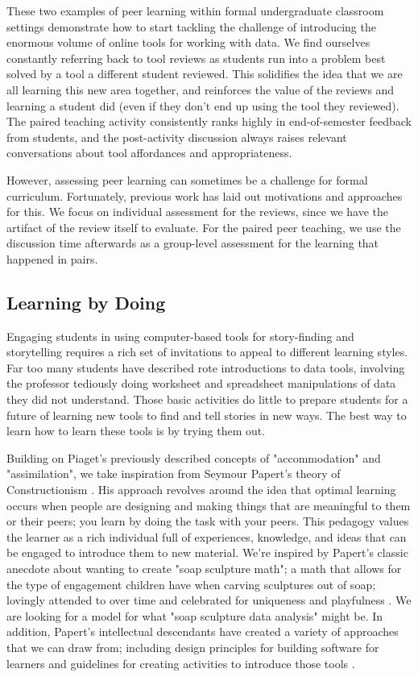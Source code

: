 \documentclass{acm_proc_article-sp}
\begin{document}
These two examples of peer learning within formal undergraduate classroom settings demonstrate how to start tackling the challenge of introducing the enormous volume of online tools for working with data.  We find ourselves constantly referring back to tool reviews as students run into a problem best solved by a tool a different student reviewed.  This solidifies the idea that we are all learning this new area together, and reinforces the value of the reviews and learning a student did (even if they don't end up using the tool they reviewed).  The paired teaching activity consistently ranks highly in end-of-semester feedback from students, and the post-activity discussion always raises relevant conversations about tool affordances and appropriateness.

However, assessing peer learning can sometimes be a challenge for formal curriculum.  Fortunately, previous work has laid out motivations and approaches for this\cite{boud_peer_1999}.  We focus on individual assessment for the reviews, since we have the artifact of the review itself to evaluate.  For the paired peer teaching, we use the discussion time afterwards as a group-level assessment for the learning that happened in pairs.

\subsection{Learning by Doing}

Engaging students in using computer-based tools for story-finding and storytelling requires a rich set of invitations to appeal to different learning styles.  Far too many students have described rote introductions to data tools, involving the professor tediously doing worksheet and spreadsheet manipulations of data they did not understand. Those basic activities do little to prepare students for a future of learning new tools to find and tell stories in new ways. The best way to learn how to learn these tools is by trying them out.

Building on Piaget's previously described concepts of "accommodation" and "assimilation", we take inspiration from Seymour Papert's theory of Constructionism \cite{papert_childrens_1994}.  His approach revolves around the idea that optimal learning occurs when people are designing and making things that are meaningful to them or their peers; you learn by doing the task with your peers.  This pedagogy values the learner as a rich individual full of experiences, knowledge, and ideas that can be engaged to introduce them to new material.  We're inspired by Papert's classic anecdote about wanting to create "soap sculpture math"; a math that allows for the type of engagement children have when carving sculptures out of soap; lovingly attended to over time and celebrated for uniqueness and playfulness \cite{harel_situating_1991}.  We are looking for a model for what "soap sculpture data analysis" might be. In addition, Papert's intellectual descendants have created a variety of approaches that we can draw from; including design principles for building software for learners \cite{harel_software_1988,resnick_reflections_2005} and guidelines for creating activities to introduce those tools  \cite{resnick_designing_2013}.
\end{document}
